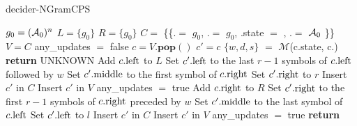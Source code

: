\begin{algorithm}
    \caption{{\sc decider-NGramCPS}}\label{alg:NGramCPS}

    \begin{algorithmic}[1]

        \State $g_0 = (\mathcal{A}_0)^n$ 
        \State $L = \{ g_0 \}$ 
        \State $R = \{ g_0 \}$ 
        \State $C =$ \{\{.\leftngram $=$ $g_0$, .\rightngram $=$ $g_0$, .state $=$ \stateA, .\middlesymbol $=$ $\mathcal{A}_0$ \}\} 
        \label{alg:NGramCPS:line:whileTrue}
        \State $V = C$
        \State any\_updates $=$ false
        \State $c = V.\textbf{pop}()$
        \State $c' = c$
        \State $\{w,d,s\}$ $=$ $\mathcal{M}$(c.state, c.\middlesymbol) 
        \State {} 
        \State \textbf{return} UNKNOWN\label{alg:NGramCPS:line:unknown}
        \EndIf
        \State {}
        \State Add $c.\text{left}$ to $L$ \label{alg:NGramCPS:line:insertL}
        \State Set $c'.\text{left}$ to the last $r-1$ symbols of $c.\text{left}$ followed by $w$
        \State Set $c'.\text{middle}$ to the first symbol of $c.\text{right}$
        \State Set $c'.\text{right}$ to $r$
        \State \tabi Insert $c'$ in $C$ \label{alg:NGramCPS:line:insertInConfSet}
        \State \tabi Insert $c'$ in $V$ \label{alg:NGramCPS:line:insertInConfSetToVisit}
        \State \tabi any\_updates $=$ true
        \EndIf
        \EndFor
        \EndIf
        \State {} \label{alg:NGramCPS:line:moveLeft}
        \State Add $c.\text{right}$ to $R$
        \State Set $c'.\text{right}$ to the first $r-1$ symbols of $c.\text{right}$ preceded by $w$
        \State Set $c'.\text{middle}$ to the last symbol of $c.\text{left}$
        \State Set $c'.\text{left}$ to $l$
        \State \tabi Insert $c'$ in $C$
        \State \tabi Insert $c'$ in $V$
        \State \tabi any\_updates $=$ true
        \EndIf
        \EndFor
        \EndIf
        \EndWhile
        \State {}
        \State \textbf{return} \NONHALT\label{alg:NGramCPS:line:nonhalt} 
        \EndIf

        \EndWhile
    \end{algorithmic}
\end{algorithm}
